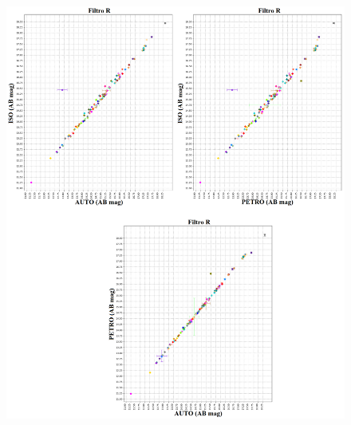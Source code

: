 \begin{anexosenv}
    \begin{figure}[h]
        \centering
        \includegraphics[width=1.0\textwidth]{Imagens/r_iso_auto.png}
        \caption[]{}
        \label{fig:r_iso_auto} 
    \end{figure}


\end{anexosenv}
